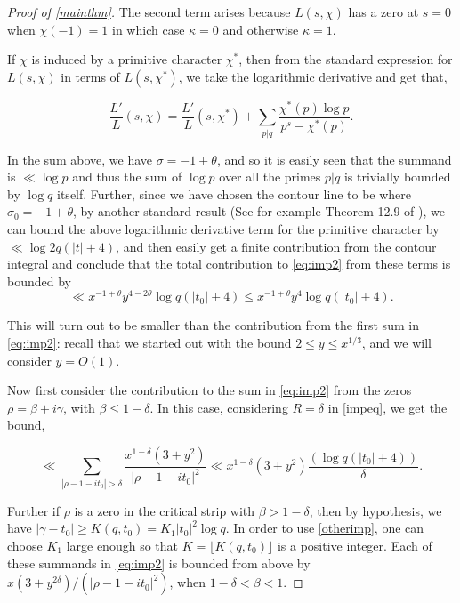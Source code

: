 \documentclass[10pt,a4paper]{amsart}
\begin{document}
\begin{proof}[Proof of \cref{mainthm}]
\noindent The second term arises because $L(s,\chi)$ has a zero at $s=0$ when $\chi(-1)=1$ in which case $\kappa=0$ and otherwise $\kappa=1$.

If $\chi$ is induced by a primitive character $\chi^{*}$, then from the standard expression for $L(s,\chi)$ in terms of $L(s,\chi^{*})$, we take the logarithmic derivative and get that,

\begin{equation*}
    \frac{L'}{L}(s,\chi)=\frac{L'}{L}(s,\chi^{*})+\sum\limits_{p|q} \frac{\chi^{*}(p)\log p}{p^{s}-\chi^{*}(p)}.
\end{equation*}

In the sum above, we have $\sigma=-1+\theta$, and so it is easily seen that the summand is $\ll \log p$ and thus the sum of $\log p$ over all the primes $p|q$ is trivially bounded by $\log q$ itself. Further, since we have chosen the contour line to be where $\sigma_0=-1+\theta$, by another standard result (See for example Theorem 12.9 of \cite{Mont}), we can bound the above logarithmic derivative term for the primitive character by $\ll \log 2q(|t|+4)$, and then easily get a finite contribution from the contour integral and conclude that the total contribution to \cref{eq:imp2} from these terms is bounded by
\begin{equation*}
\ll x^{-1+\theta}y^{4-2\theta} \log q(|t_0|+4)\leq x^{-1+\theta}y^{4} \log q(|t_0|+4).
\end{equation*}

\noindent This will turn out to be smaller than the contribution from the first sum in \cref{eq:imp2}: recall that we started out with the bound $2\leq y \leq x^{1/3}$, and we will consider $y=O(1)$.  

Now first consider the contribution to the sum in \cref{eq:imp2} from the zeros $\rho=\beta +i\gamma$, with $\beta \leq 1-\delta$. In this case, considering $R=\delta$ in \cref{impeq}, we get the bound,

$$\ll \sum\limits_{|\rho-1-it_0|>\delta} \frac{x^{1-\delta}(3+y^{2})}{|\rho -1-it_0|^{2}} \ll x^{1-\delta}(3+y^{2}) \frac{(\log q(|t_0|+4))}{\delta}.$$

\noindent Further if $\rho$ is a zero in the critical strip with $\beta >1-\delta$, then by hypothesis, we have $|\gamma-t_0|\geq K(q,t_0)=K_{1}|t_0|^{2}\log q$. In order to use \cref{otherimp}, one can choose $K_1$ large enough so that $ K=\lfloor K(q,t_0) \rfloor$ is a positive integer. Each of these summands in \cref{eq:imp2} is bounded from above by $x(3+y^{2\delta})/(|\rho-1-it_0|^{2})$, when $1-\delta<\beta<1$.


\end{proof}
\end{document}
